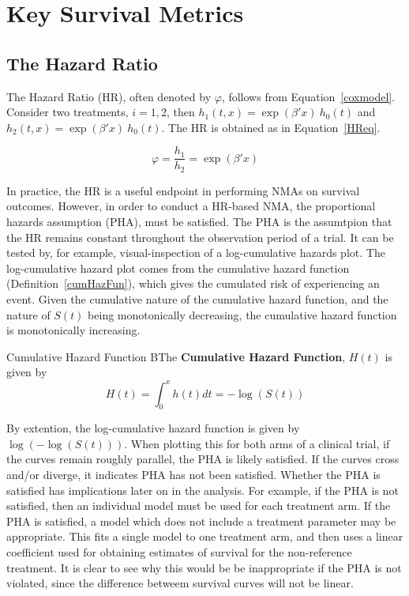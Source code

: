 \section{Key Survival Metrics}

\subsection{The Hazard Ratio}
The Hazard Ratio (HR), often denoted by $\varphi$, follows from Equation~\ref{coxmodel}. Consider two treatments, $i = 1, 2$, then $h_1(t, x) = \exp(\beta'x) \ h_0(t)$ and $h_2(t, x) = \exp(\beta'x) \ h_0(t)$. The HR is obtained as in Equation~\ref{HReq}.

\begin{equation}
    \varphi = \frac{h_1}{h_2} = \exp(\beta' x)
    \label{HReq}
\end{equation}

In practice, the HR is a useful endpoint in performing NMAs on survival outcomes. However, in order to conduct a HR-based NMA, the proportional hazards assumption (PHA), must be satisfied. The PHA is the assumtpion that the HR remains constant throughout the observation period of a trial. It can be tested by, for example, visual-inspection of a log-cumulative hazards plot. The log-cumulative hazard plot comes from the cumulative hazard function (Definition~\ref{cumHazFun}), which gives the cumulated risk of experiencing an event. Given the cumulative nature of the cumulative hazard function, and the nature of $S(t)$ being monotonically decreasing, the cumulative hazard function is monotonically increasing.

\begin{definition}[label=cumHazFun]{Cumulative Hazard Function}
    BThe \textbf{Cumulative Hazard Function}, $H(t)$ is given by 
    \begin{equation}
        H(t) = \int_{0}^{x}h(t)dt = -\log(S(t))  
    \end{equation}
\end{definition}

By extention, the log-cumulative hazard function is given by $\log(-\log(S(t)))$. When plotting this for both arms of a clinical trial, if the curves remain roughly parallel, the PHA is likely satisfied. If the curves cross and/or diverge, it indicates PHA has not been satisfied. Whether the PHA is satisfied has implications later on in the analysis. For example, if the PHA is not satisfied, then an individual model must be used for each treatment arm. If the PHA is satisfied, a model which does not include a treatment parameter may be appropriate. This fits a single model to one treatment arm, and then uses a linear coefficient used for obtaining estimates of survival for the non-reference treatment. It is clear to see why this would be be inappropriate if the PHA is not violated, since the difference betweem survival curves will not be linear. 

